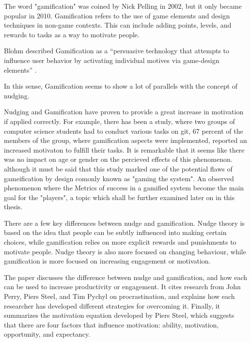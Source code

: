 
The word "gamification" was coined by Nick Pelling in 2002,
but it only became popular in 2010. Gamification refers to the use
of game elements and design techniques in non-game contexts.
This can include adding points, levels, and rewards to tasks as a
way to motivate people. \cite{burke2011gamification}

Blohm described Gamification as a
“persuasive technology that attempts to influence user
behavior by activating individual motives via game-design
elements” \cite{Blohm}.

In this sense, Gamification seems to show a lot of parallels
with the concept of nudging.



Nudging and Gamification have proven to provide a great increase in motivation if applied correctly. For example, there has been a study, where two groups of computer science students had to conduct various tasks on git,  67 percent of the members of the group, where gamification aspects  were implemented, reported an increased  motivaton to fulfill their tasks. It  is remarkable that it seems like there was no impact on age or gender on the percieved effects of this  phenomenon.
although it must be said that this study  marked one of the potential flaws of gameification by design comonly known as "gaming the system". An  observed phenomenon where the Metrics of success in a gamified system  become the main goal for the "players", a topic which shall be further examined later on in this thesis. \cite{Ozdamli2021Aug}






There are a few key differences between nudge and gamification. Nudge theory is based on the idea that people can be subtly influenced into making certain choices, while gamification relies on more explicit rewards and punishments to motivate people. Nudge theory is also more focused on changing behaviour, while gamification is more focused on increasing engagement or motivation.




The paper discusses the difference between nudge and gamification, and how each can be used to increase productivity or engagement. It cites research from John Perry, Piers Steel, and Tim Pychyl on procrastination, and explains how each researcher has developed different strategies for overcoming it. Finally, it summarizes the motivation equation developed by Piers Steel, which suggests that there are four factors that influence motivation: ability, motivation, opportunity, and expectancy.


